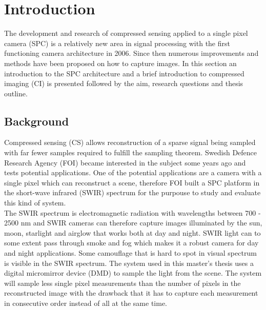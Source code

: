 \chapter{Introduction}\label{cha:Introduction}
The development and research of compressed sensing applied to a single pixel camera (SPC) is a relatively new area in signal processing with the first functioning camera architecture in 2006. Since then numerous improvements and methods have been proposed on how to capture images. In this section an introduction to the SPC architecture and a brief introduction to compressed imaging (CI) is presented followed by the aim, research questions and thesis outline. 



\section{Background}
Compressed sensing (CS) allows reconstruction of a sparse signal being sampled with far fewer samples required to fulfill the sampling theorem. Swedish Defence Research Agency (FOI) became interested in the subject some years ago and tests potential applications. One of the potential applications are a camera with a single pixel which can reconstruct a scene, therefore FOI built a SPC platform in the short-wave infrared (SWIR) spectrum for the purpouse to study and evaluate this kind of system.\\[0.1in]

The SWIR spectrum is electromagnetic radiation with wavelengths between 700 - 2500 nm and SWIR cameras can therefore capture images illuminated by the sun, moon, starlight and airglow that works both at day and night. SWIR light can to some extent pass through smoke and fog which makes it a robust camera for day and night applications. Some camouflage that is hard to spot in visual spectrum is visible in the SWIR spectrum. The system used in this master’s thesis uses a digital micromirror device (DMD) to sample the light from the scene. The system will sample less single pixel measurements than the number of pixels in the reconstructed image with the drawback that it has to capture each measurement in consecutive order instead of all at the same time.

